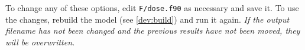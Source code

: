 To change any of these options, edit \verb|F/dose.f90| as necessary and save it.  To use the 
changes, rebuild the model (see \ref{dev:build}) and run it again.  \emph{If the output filename has 
not been changed and the previous results have not been moved, they will be overwritten.}




